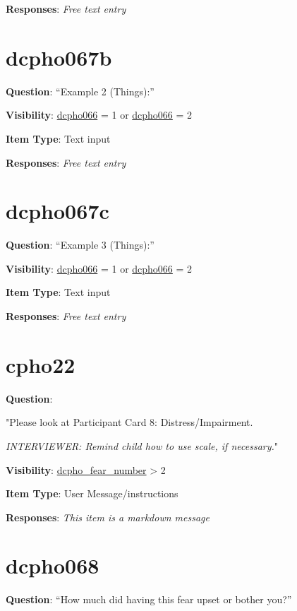 \documentclass[]{book}
\begin{document}
\textbf{Responses}: \emph{Free text entry}

\hypertarget{dcpho067b}{%
\section{dcpho067b}\label{dcpho067b}}

\textbf{Question}: ``Example 2 (Things):''

\textbf{Visibility}: \protect\hyperlink{dcpho066}{dcpho066} = 1 or \protect\hyperlink{dcpho066}{dcpho066} = 2

\textbf{Item Type}: Text input

\textbf{Responses}: \emph{Free text entry}

\hypertarget{dcpho067c}{%
\section{dcpho067c}\label{dcpho067c}}

\textbf{Question}: ``Example 3 (Things):''

\textbf{Visibility}: \protect\hyperlink{dcpho066}{dcpho066} = 1 or \protect\hyperlink{dcpho066}{dcpho066} = 2

\textbf{Item Type}: Text input

\textbf{Responses}: \emph{Free text entry}

\hypertarget{cpho22}{%
\section{cpho22}\label{cpho22}}

\textbf{Question}:

"Please look at Participant Card 8: Distress/Impairment.

\emph{INTERVIEWER: Remind child how to use scale, if necessary.}"

\textbf{Visibility}: \protect\hyperlink{dcpho_fear_number}{dcpho\_fear\_number} \textgreater{} 2

\textbf{Item Type}: User Message/instructions

\textbf{Responses}: \emph{This item is a markdown message}

\hypertarget{dcpho068}{%
\section{dcpho068}\label{dcpho068}}

\textbf{Question}: ``How much did having this fear upset or bother you?''
\end{document}
